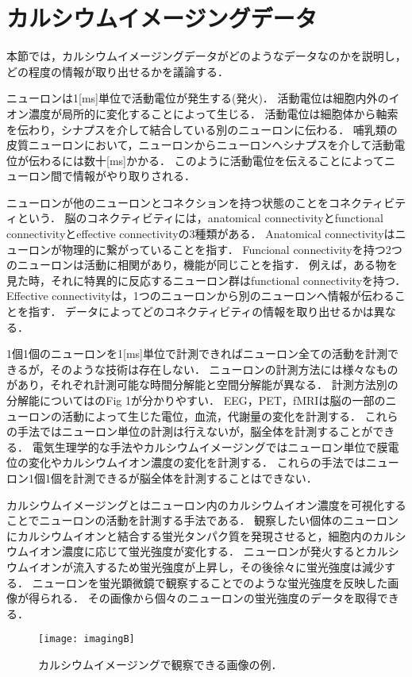\section{カルシウムイメージングデータ}
本節では，カルシウムイメージングデータがどのようなデータなのかを説明し，どの程度の情報が取り出せるかを議論する．

ニューロンは1[ms]単位で活動電位が発生する(発火)．
活動電位は細胞内外のイオン濃度が局所的に変化することによって生じる．
活動電位は細胞体から軸索を伝わり，シナプスを介して結合している別のニューロンに伝わる．
哺乳類の皮質ニューロンにおいて，ニューロンからニューロンへシナプスを介して活動電位が伝わるには数十[ms]かかる\cite{Izhikevich2004}．
このように活動電位を伝えることによってニューロン間で情報がやり取りされる．

ニューロンが他のニューロンとコネクションを持つ状態のことをコネクティビティという．
脳のコネクティビティには，anatomical connectivityとfunctional connectivityとeffective connectivityの3種類がある\cite{Sporns2007}．
Anatomical connectivityはニューロンが物理的に繋がっていることを指す．
Funcional connectivityを持つ2つのニューロンは活動に相関があり，機能が同じことを指す．
例えば，ある物を見た時，それに特異的に反応するニューロン群はfunctional connectivityを持つ．
Effective connectivityは，1つのニューロンから別のニューロンへ情報が伝わることを指す．
データによってどのコネクティビティの情報を取り出せるかは異なる．

1個1個のニューロンを1[ms]単位で計測できればニューロン全ての活動を計測できるが，そのような技術は存在しない．
ニューロンの計測方法には様々なものがあり，それぞれ計測可能な時間分解能と空間分解能が異なる．
計測方法別の分解能については\cite{Sejnowski2014}のFig 1が分かりやすい．
EEG，PET，fMRIは脳の一部のニューロンの活動によって生じた電位，血流，代謝量の変化を計測する．
これらの手法ではニューロン単位の計測は行えないが，脳全体を計測することができる．
電気生理学的な手法やカルシウムイメージングではニューロン単位で膜電位の変化やカルシウムイオン濃度の変化を計測する．
これらの手法ではニューロン1個1個を計測できるが脳全体を計測することはできない．

カルシウムイメージングとはニューロン内のカルシウムイオン濃度を可視化することでニューロンの活動を計測する手法である．
観察したい個体のニューロンにカルシウムイオンと結合する蛍光タンパク質を発現させると，細胞内のカルシウムイオン濃度に応じて蛍光強度が変化する．
ニューロンが発火するとカルシウムイオンが流入するため蛍光強度が上昇し，その後徐々に蛍光強度は減少する．
ニューロンを蛍光顕微鏡で観察することでのような蛍光強度を反映した画像が得られる．
その画像から個々のニューロンの蛍光強度のデータを取得できる．
\begin{figure}[htbp]
	\centering
	\texttt{[image: imagingB]}
	\caption{カルシウムイメージングで観察できる画像の例．}
	\label{fig:imagingB}
\end{figure}

